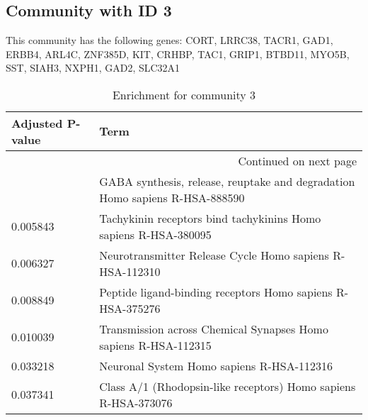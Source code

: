 \subsection*{Community with ID 3}
This community has the following genes: CORT, LRRC38, TACR1, GAD1, ERBB4, ARL4C, ZNF385D, KIT, CRHBP, TAC1, GRIP1, BTBD11, MYO5B, SST, SIAH3, NXPH1, GAD2, SLC32A1
\\
\begin{longtable}{p{2.4cm}p{14.5cm}}
\caption{Enrichment for community 3}\\
\toprule
Adjusted \newline P-value &                                                                         Term \\
\midrule
\endhead
\midrule
\multicolumn{2}{r}{{Continued on next page}} \\
\midrule
\endfoot

\bottomrule
\endlastfoot
                 0.000899 &  GABA synthesis, release, reuptake and degradation Homo sapiens R-HSA-888590 \\
                 0.005843 &              Tachykinin receptors bind tachykinins Homo sapiens R-HSA-380095 \\
                 0.006327 &                     Neurotransmitter Release Cycle Homo sapiens R-HSA-112310 \\
                 0.008849 &                   Peptide ligand-binding receptors Homo sapiens R-HSA-375276 \\
                 0.010039 &              Transmission across Chemical Synapses Homo sapiens R-HSA-112315 \\
                 0.033218 &                                    Neuronal System Homo sapiens R-HSA-112316 \\
                 0.037341 &               Class A/1 (Rhodopsin-like receptors) Homo sapiens R-HSA-373076 \\
\end{longtable}


